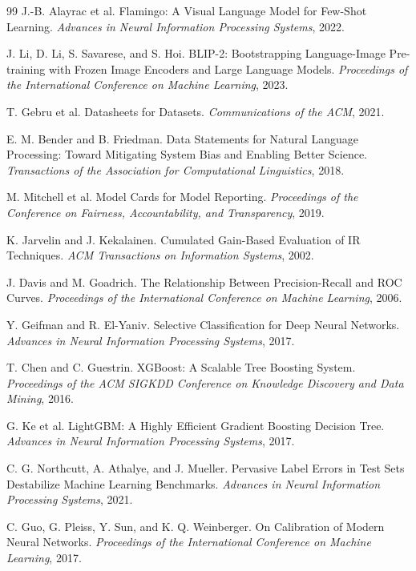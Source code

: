 \documentclass{article}
\begin{document}
\begin{thebibliography}{99}
J.-B. Alayrac et al.
Flamingo: A Visual Language Model for Few-Shot Learning.
\emph{Advances in Neural Information Processing Systems}, 2022.

J. Li, D. Li, S. Savarese, and S. Hoi.
BLIP-2: Bootstrapping Language-Image Pre-training with Frozen Image Encoders and Large Language Models.
\emph{Proceedings of the International Conference on Machine Learning}, 2023.

T. Gebru et al.
Datasheets for Datasets.
\emph{Communications of the ACM}, 2021.

E. M. Bender and B. Friedman.
Data Statements for Natural Language Processing: Toward Mitigating System Bias and Enabling Better Science.
\emph{Transactions of the Association for Computational Linguistics}, 2018.

M. Mitchell et al.
Model Cards for Model Reporting.
\emph{Proceedings of the Conference on Fairness, Accountability, and Transparency}, 2019.

K. Jarvelin and J. Kekalainen.
Cumulated Gain-Based Evaluation of IR Techniques.
\emph{ACM Transactions on Information Systems}, 2002.

J. Davis and M. Goadrich.
The Relationship Between Precision-Recall and ROC Curves.
\emph{Proceedings of the International Conference on Machine Learning}, 2006.

Y. Geifman and R. El-Yaniv.
Selective Classification for Deep Neural Networks.
\emph{Advances in Neural Information Processing Systems}, 2017.

T. Chen and C. Guestrin.
XGBoost: A Scalable Tree Boosting System.
\emph{Proceedings of the ACM SIGKDD Conference on Knowledge Discovery and Data Mining}, 2016.

G. Ke et al.
LightGBM: A Highly Efficient Gradient Boosting Decision Tree.
\emph{Advances in Neural Information Processing Systems}, 2017.

C. G. Northcutt, A. Athalye, and J. Mueller.
Pervasive Label Errors in Test Sets Destabilize Machine Learning Benchmarks.
\emph{Advances in Neural Information Processing Systems}, 2021.

C. Guo, G. Pleiss, Y. Sun, and K. Q. Weinberger.
On Calibration of Modern Neural Networks.
\emph{Proceedings of the International Conference on Machine Learning}, 2017.

\end{thebibliography}
\endgroup
\end{document}
